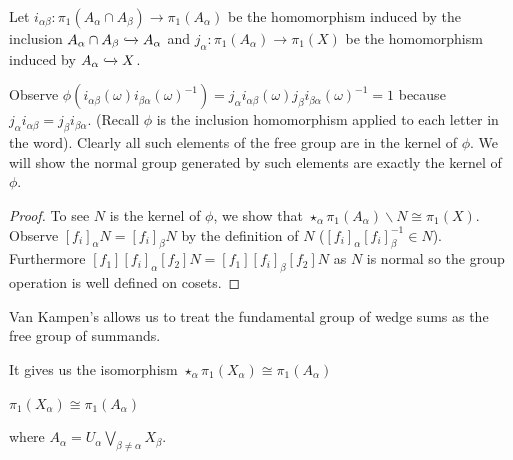 \documentclass[10pt]{article}
\begin{document}
\begin{theorem}

	Let $i_{\alpha\beta}: \pi_1(A_{\alpha} \cap A_{\beta}) \to \pi_1(A_{\alpha})$ be the homomorphism induced by the inclusion $A_{\alpha} \cap A_{\beta} \xhookrightarrow{} A_{\alpha}$ and $j_{\alpha}: \pi_1(A_{\alpha}) \to \pi_1(X)$ be the homomorphism induced by $A_{\alpha} \xhookrightarrow{} X$.

	Observe $\phi(i_{\alpha\beta}(\omega)i_{\beta\alpha}(\omega)^{-1}) = j_{\alpha}i_{\alpha\beta}(\omega)j_{\beta}i_{\beta\alpha}(\omega)^{-1} = 1$ because $j_{\alpha}i_{\alpha\beta} = j_{\beta}i_{\beta\alpha}$. (Recall $\phi$ is the inclusion homomorphism applied to each letter in the word). Clearly all such elements of the free group are in the kernel of $\phi$. We will show the normal group generated by such elements are exactly the kernel of $\phi$.

\end{theorem}

\begin{proof}

	To see $N$ is the kernel of $\phi$, we show that $\star_{\alpha} \pi_1(A_{\alpha}) \backslash N \cong \pi_1(X)$.
	Observe $[f_i]_{\alpha}N = [f_i]_{\beta}N$ by the definition of $N$ ($[f_i]_{\alpha}[f_i]_{\beta}^{-1} \in N$). Furthermore $[f_1][f_i]_{\alpha}[f_2]N = [f_1][f_i]_{\beta}[f_2]N$ as $N$ is normal so the group operation is well defined on cosets.

\end{proof}

\begin{note}

Van Kampen's allows us to treat the fundamental group of wedge sums as the free group of summands.

It gives us the isomorphism $\star_{\alpha} \pi_1(X_{\alpha}) \cong \pi_1(A_{\alpha})$

$\pi_1(X_{\alpha}) \cong \pi_1(A_{\alpha})$

where $A_{\alpha} = U_{\alpha} \bigvee_{\beta \neq \alpha} X_{\beta}$.

\end{note}
\end{document}
